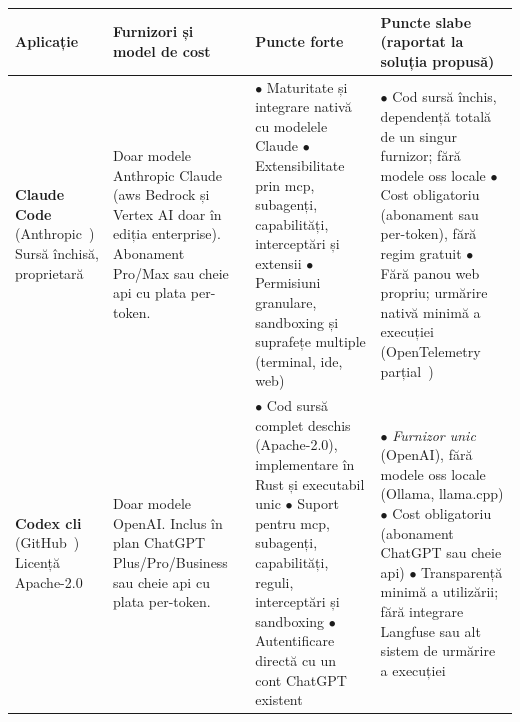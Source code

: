 \documentclass[12pt, a4paper, oneside, romanian]{teza-upb}
\begin{document}
    \begin{table}[H]
    \centering
    \scriptsize
    \setlength{\tabcolsep}{4pt}
    \renewcommand{\arraystretch}{1.5}
    \vspace{2mm}
      \begin{tabularx}{\textwidth}{@{} >{\hsize=0.55\hsize\RaggedRight}X >{\hsize=0.95\hsize\RaggedRight}X >{\hsize=1.25\hsize\RaggedRight}X >{\hsize=1.25\hsize\RaggedRight}X @{}}
        \toprule
        \textbf{Aplicație} & \textbf{Furnizori și model de cost} & \textbf{Puncte forte} & \textbf{Puncte slabe (raportat la soluția propusă)} \\
        \midrule

        \textbf{Claude Code} \newline (Anthropic~\cite{api_claude_code}) \newline Sursă închisă, proprietară &
        Doar modele Anthropic Claude (\ac{aws} Bedrock și Vertex AI doar în ediția enterprise). \newline
        Abonament Pro/Max sau cheie \ac{api} cu plata per-token. &
        $\bullet$ Maturitate și integrare nativă cu modelele Claude\newline
        $\bullet$ Extensibilitate prin \ac{mcp}, subagenți, capabilități, interceptări și extensii\newline
        $\bullet$ Permisiuni granulare, sandboxing și suprafețe multiple (terminal, \ac{ide}, web) &
        $\bullet$ Cod sursă închis, dependență totală de un singur furnizor; fără modele \ac{oss} locale\newline
        $\bullet$ Cost obligatoriu (abonament sau per-token), fără regim gratuit\newline
        $\bullet$ Fără panou web propriu; urmărire nativă minimă a execuției (OpenTelemetry parțial~\cite{web_opentelemetry}) \\
        \midrule

        \textbf{Codex \ac{cli}} \newline (GitHub~\cite{gh_codex}) \newline Licență Apache-2.0 &
        Doar modele OpenAI. \newline
        Inclus în plan ChatGPT Plus/Pro/Business sau cheie \ac{api} cu plata per-token. &
        $\bullet$ Cod sursă complet deschis (Apache-2.0), implementare în Rust și executabil unic\newline
        $\bullet$ Suport pentru \ac{mcp}, subagenți, capabilități, reguli, interceptări și sandboxing\newline
        $\bullet$ Autentificare directă cu un cont ChatGPT existent &
        $\bullet$ \textit{Furnizor unic} (OpenAI), fără modele \ac{oss} locale (Ollama, llama.cpp)\newline
        $\bullet$ Cost obligatoriu (abonament ChatGPT sau cheie \ac{api})\newline
        $\bullet$ Transparență minimă a utilizării; fără integrare Langfuse sau alt sistem de urmărire a execuției \\
        \midrule


\end{tabularx}
\end{table}
\end{document}
